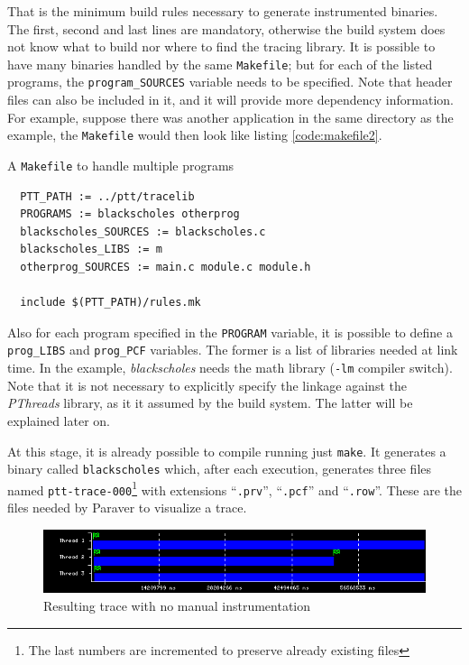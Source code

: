 That is the minimum build rules necessary to generate instrumented binaries.
The first, second and last lines are mandatory, otherwise the build system does
not know what to build nor where to find the tracing library.  It is possible to
have many binaries handled by the same \verb:Makefile:; but for each of the
listed programs, the \verb:program_SOURCES: variable needs to be specified.
Note that header files can also be included in it, and it will provide more
dependency information.  For example, suppose there was another application in
the same directory as the example, the \verb:Makefile: would then look like
listing \ref{code:makefile2}.

\begin{listing}
\label{code:makefile2}
\caption{A \texttt{Makefile} to handle multiple programs}
\begin{verbatim}
  PTT_PATH := ../ptt/tracelib
  PROGRAMS := blackscholes otherprog
  blackscholes_SOURCES := blackscholes.c
  blackscholes_LIBS := m
  otherprog_SOURCES := main.c module.c module.h

  include $(PTT_PATH)/rules.mk
\end{verbatim}
\end{listing}

Also for each program specified in the \verb:PROGRAM: variable, it is possible
to define a \verb:prog_LIBS: and \verb:prog_PCF: variables.  The former is a
list of libraries needed at link time.  In the example, \emph{blackscholes}
needs the math library (\verb:-lm: compiler switch).  Note that it is not
necessary to explicitly specify the linkage against the \emph{PThreads} library,
as it it assumed by the build system.  The latter will be explained later on.

At this stage, it is already possible to compile running just \verb:make:.  It
generates a binary called \verb:blackscholes: which, after each execution,
generates three files named \verb:ptt-trace-000:\footnote{The last numbers are
incremented to preserve already existing files} with extensions ``\verb:.prv:'',
``\verb:.pcf:'' and ``\verb:.row:''.  These are the files needed by Paraver to
visualize a trace.

\begin{figure}
\centering
\includegraphics{pics/bs-stage1.png}
\caption{Resulting trace with no manual instrumentation}
\label{fig:bs-stage1}
\end{figure}

